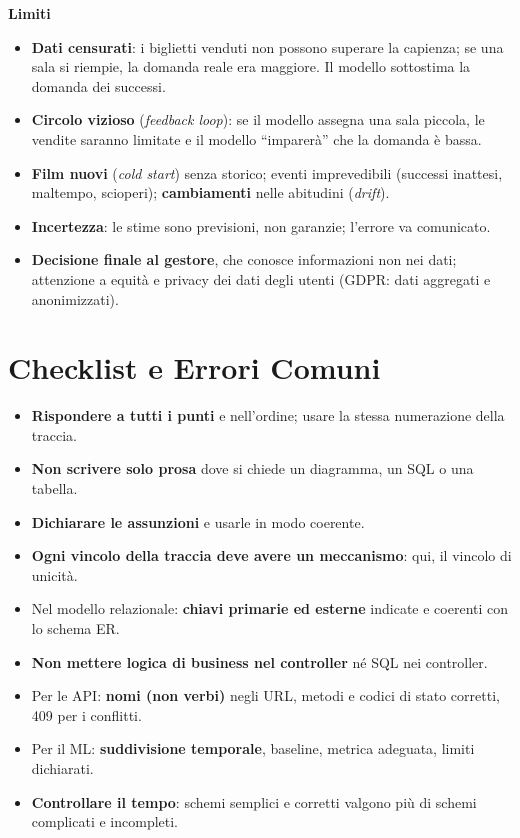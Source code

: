 \textbf{Limiti}
\begin{itemize}
    \item \textbf{Dati censurati}: i biglietti venduti non possono superare la capienza; se una sala si riempie, la domanda reale era maggiore. Il modello sottostima la domanda dei successi.
    \item \textbf{Circolo vizioso} (\emph{feedback loop}): se il modello assegna una sala piccola, le vendite saranno limitate e il modello ``imparerà'' che la domanda è bassa.
    \item \textbf{Film nuovi} (\emph{cold start}) senza storico; eventi imprevedibili (successi inattesi, maltempo, scioperi); \textbf{cambiamenti} nelle abitudini (\emph{drift}).
    \item \textbf{Incertezza}: le stime sono previsioni, non garanzie; l'errore va comunicato.
    \item \textbf{Decisione finale al gestore}, che conosce informazioni non nei dati; attenzione a equità e privacy dei dati degli utenti (GDPR: dati aggregati e anonimizzati).
\end{itemize}

\section{Checklist e Errori Comuni}
\begin{itemize}
    \item \textbf{Rispondere a tutti i punti} e nell'ordine; usare la stessa numerazione della traccia.
    \item \textbf{Non scrivere solo prosa} dove si chiede un diagramma, un SQL o una tabella.
    \item \textbf{Dichiarare le assunzioni} e usarle in modo coerente.
    \item \textbf{Ogni vincolo della traccia deve avere un meccanismo}: qui, il vincolo di unicità.
    \item Nel modello relazionale: \textbf{chiavi primarie ed esterne} indicate e coerenti con lo schema ER.
    \item \textbf{Non mettere logica di business nel controller} né SQL nei controller.
    \item Per le API: \textbf{nomi (non verbi)} negli URL, metodi e codici di stato corretti, 409 per i conflitti.
    \item Per il ML: \textbf{suddivisione temporale}, baseline, metrica adeguata, limiti dichiarati.
    \item \textbf{Controllare il tempo}: schemi semplici e corretti valgono più di schemi complicati e incompleti.
\end{itemize}
